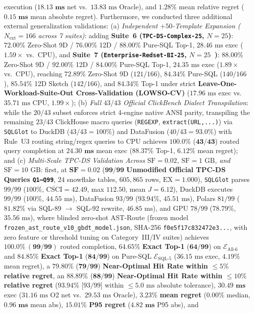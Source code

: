 \documentclass[10pt,a4paper]{article}
\begin{document}
\begin{enumerate}[leftmargin=1.5em,itemsep=0.8pt]
execution ($\mathbf{18.13\text{ ms}}$ net vs.\ $13.83\text{ ms}$ Oracle), and $\mathbf{1.28\%}$ mean relative regret ($\mathbf{0.15\text{ ms}}$ mean absolute regret). Furthermore, we conducted three additional external generalization validations: (a) \emph{Independent $+50$-Template Expansion ($N_{\text{ext}}=166$ across 7 suites)}: adding \textbf{Suite~6 (\texttt{TPC-DS-Complex-25}, $N=25$)}: $72.00\%$ Zero-Shot 9D / $76.00\%$ 12D / $88.00\%$ Pure-SQL Top-1, $28.46\text{ ms}$ exec ($1.59\times$ vs.\ CPU), and \textbf{Suite~7 (\texttt{Enterprise-Redset-BI-25}, $N=25$~\cite{vanrenen2024redset})}: $88.00\%$ Zero-Shot 9D / $92.00\%$ 12D / $84.00\%$ Pure-SQL Top-1, $24.35\text{ ms}$ exec ($1.89\times$ vs.\ CPU), reaching $\mathbf{72.89\%}$ Zero-Shot 9D ($121/166$), $\mathbf{84.34\%}$ Pure-SQL ($140/166$), $\mathbf{85.54\%}$ 12D Sketch ($142/166$), and $\mathbf{84.34\%}$ Top-1 under strict \textbf{Leave-One-Workload-Suite-Out Cross-Validation (LOWSO-CV)} ($17.96\text{ ms}$ exec vs.\ $35.71\text{ ms}$ CPU, $1.99\times$); (b) \emph{Full $43/43$ Official ClickBench Dialect Transpilation}: while the $20/43$ subset enforces strict 4-engine native ANSI parity, transpiling the remaining $23/43$ ClickHouse macro queries (\texttt{REGEXP}, \texttt{extract(URL,...)}) via \texttt{SQLGlot} to DuckDB ($43/43 = 100\%$) and DataFusion ($40/43 = 93.0\%$) with Rule~U3 routing string/regex queries to CPU achieves $\mathbf{100.0\%}$ ($\mathbf{43/43}$) routed query completion at $\mathbf{24.30\text{ ms}}$ mean exec ($\mathbf{88.37\%}$ Top-1, $\mathbf{6.12\%}$ mean regret); and (c) \emph{Multi-Scale TPC-DS Validation Across $\text{SF}=0.02$, $\text{SF}=1\text{ GB}$, and $\text{SF}=10\text{ GB}$}: first, at $\mathbf{\text{SF}=0.02}$ ($\mathbf{99/99}$ \textbf{Unmodified Official TPC-DS Queries \texttt{Q1--Q99}}, $24$ snowflake tables, $605{,}865$ rows, $\text{EX}=1.000$), \texttt{SQLGlot} parses $99/99$ ($100\%$, $\overline{\text{CSCI}}=42.49$, max $112.50$, mean $J=6.12$), DuckDB executes $99/99$ ($100\%$, $44.55\text{ ms}$), DataFusion $93/99$ ($93.94\%$, $45.51\text{ ms}$), Polars $81/99$ ($81.82\%$ via SQL-89 $\rightarrow$ SQL-92 rewrite, $46.85\text{ ms}$), and GPU $78/99$ ($78.79\%$, $35.56\text{ ms}$), where blinded zero-shot AST-Route (frozen model \texttt{frozen\_ast\_route\_v10\_gbdt\_model.json}, SHA-256 \texttt{f0e5f17c832472e3...}, with zero feature or threshold tuning on Category~III/IV suites) achieves $\mathbf{100.0\%\ (99/99)}$ routed completion, $\mathbf{64.65\%}$ \textbf{Exact Top-1} ($\mathbf{64/99}$) on $\mathcal{E}_{\text{All-6}}$ and $\mathbf{84.85\%}$ \textbf{Exact Top-1} ($\mathbf{84/99}$) on Pure-SQL $\mathcal{E}_{\text{SQL-5}}$ ($36.15\text{ ms}$ exec, $4.19\%$ mean regret), a $\mathbf{79.80\%}$ ($\mathbf{79/99}$) \textbf{Near-Optimal Hit Rate within $\le 5\%$ relative regret}, an $\mathbf{88.89\%}$ ($\mathbf{88/99}$) \textbf{Near-Optimal Hit Rate within $\le 10\%$ relative regret} ($\mathbf{93.94\%}$ [$93/99$] within $\le 5.0\text{ ms}$ absolute tolerance), $\mathbf{30.49\text{ ms}}$ exec ($31.16\text{ ms}$ O2 net vs.\ $29.53\text{ ms}$ Oracle), $\mathbf{3.23\%}$ \textbf{mean regret} ($\mathbf{0.00\%}$ median, $\mathbf{0.96\text{ ms}}$ mean abs), $\mathbf{15.01\%}$ \textbf{P95 regret} ($\mathbf{4.82\text{ ms}}$ P95 abs), and 
\end{enumerate}
\end{document}
